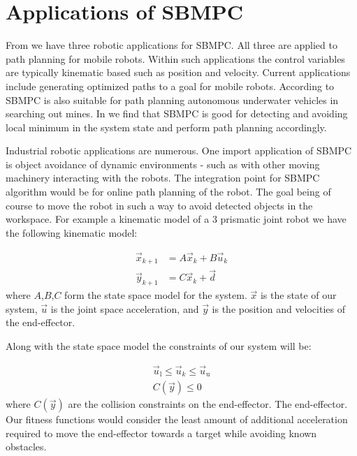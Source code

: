 \documentclass[main.tex]{subfile}
\begin{document}
\section{Applications of SBMPC} 
\label{sec:applications_of_sbmpc}

From \cite{autoVehicle,uphill,auv} we have three robotic applications for SBMPC.
All three are applied to path planning for mobile robots. Within such
applications the control variables are typically kinematic based such as
position and velocity. Current applications include generating optimized paths
to a goal for mobile robots.  According to \cite{auv} SBMPC is also suitable for
path planning autonomous underwater vehicles in searching out mines. In
\cite{uphill} we find that SBMPC is good for detecting and avoiding local
minimum in the system state and perform path planning accordingly.

Industrial robotic applications are numerous. One import application of SBMPC is
object avoidance of dynamic environments - such as with other moving machinery
interacting with the robots. The integration point for SBMPC algorithm would be
for online path planning of the robot. The goal being of course to move the
robot in such a way to avoid detected objects in the workspace. For example a
kinematic model of a $3$ prismatic joint robot we have the following kinematic
model: 

\begin{align}
	\vec{x}_{k+1} &= A\vec{x}_{k} + B\vec{u}_{k}
\\ \vec{y}_{k+1} &= C\vec{x}_{k} + \vec{d}
\end{align}
where $A$,$B$,$C$ form the state space model for the system. $\vec{x}$ is the
state of our system, $\vec{u}$ is the joint space acceleration, and $\vec{y}$ is
the position and velocities of the end-effector.

Along with the state space model the constraints of our system will be: 

\begin{align}
	\vec{u}_{\text{l}} \leq \vec{u}_{k} \leq \vec{u}_{\text{u}}
	\\C(\vec{y}) \leq 0
\end{align}
where $C(\vec{y})$ are the collision constraints on the end-effector. The
end-effector. Our fitness functions would consider the least amount of
additional acceleration required to move the end-effector towards a target while
avoiding known obstacles.

\end{document}
